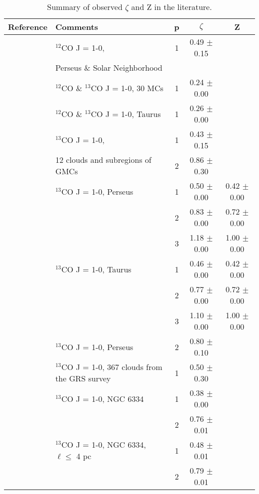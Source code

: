 \begin{table*} 
\centering 
	\begin{tabular}{llccc} 
	\centering 
		Reference & Comments & p & $\zeta$ & Z \\ \hline  \hline
		\citet{Heyer2004} & $^{12}$CO J = 1-0, &  1 &   0.49 $\pm$  0.15 &   \\ 
					& Perseus \& Solar Neighborhood & & & \\ \hline
		\citet{Heyer2015} & $^{12}$CO \& $^{13}$CO J = 1-0, 30 MCs & 1 &  0.24 $\pm$  0.00 &   \\ 
					 & $^{12}$CO \& $^{13}$CO J = 1-0, Taurus & 1 &  0.26 $\pm$  0.00 &   \\  \hline
           	\citet{Miesch1994} & $^{13}$CO J = 1-0, & 1 &  0.43 $\pm$  0.15 &   \\ 
					   & 12 clouds and subregions of GMCs & 2 &  0.86 $\pm$  0.30 &   \\  \hline
		\citet{Padoan2003} &   $^{13}$CO J = 1-0, Perseus & 1 &  0.50 $\pm$  0.00 &  0.42 $\pm$  0.00 \\ 
					   &  & 2 &  0.83 $\pm$  0.00 &  0.72 $\pm$  0.00 \\ 
					   &		 & 3 &  1.18 $\pm$  0.00 &  1.00 $\pm$  0.00 \\ 
					  &    $^{13}$CO J = 1-0, Taurus & 1 &  0.46 $\pm$  0.00 &  0.42 $\pm$  0.00 \\ 
					   &		 & 2 &  0.77 $\pm$  0.00 &  0.72 $\pm$  0.00 \\ 
					   &		 & 3 &  1.10 $\pm$  0.00 &  1.00 $\pm$  0.00 \\  \hline
		\citet{Padoan2006} & $^{13}$CO J = 1-0, Perseus & 2 &  0.80 $\pm$  0.10 &   \\  \hline
		\citet{RomanDuval2011} & $^{13}$CO J = 1-0, 367 clouds from the GRS survey & 1 &  0.50 $\pm$  0.30 & \\  \hline
		\citet{Zernickel2015} &   $^{13}$CO J = 1-0, NGC 6334 & 1 &  0.38 $\pm$  0.00 &  \\ 
					   &		 & 2 &  0.76 $\pm$  0.01 &  \\ 
					 &   $^{13}$CO J = 1-0, NGC 6334, $\ell \leq$ 4 pc  & 1 &  0.48 $\pm$  0.01 &   \\ 
					   & & 2 &  0.79 $\pm$  0.01 &  
	\end{tabular} 
	\caption{Summary of observed $\zeta$ and Z in the literature.} 
	\label{tab:discussion:summary_obs} 
\end{table*} 

